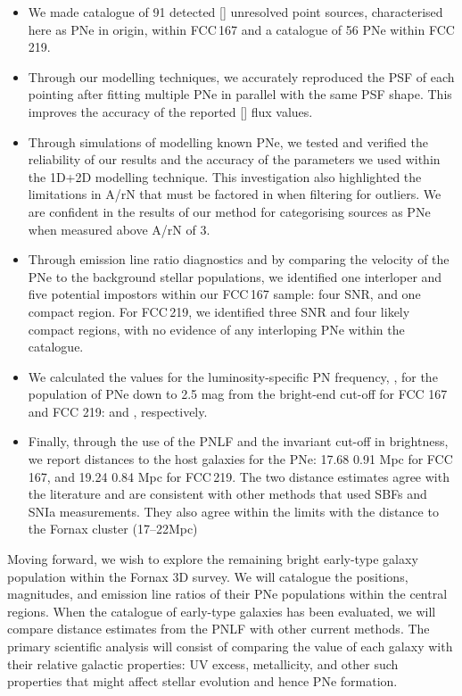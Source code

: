 \documentclass{aa}
\begin{document}
\begin{itemize}
    \item We made catalogue of 91 detected [] unresolved point sources, characterised here as PNe in origin, within FCC\,167 and a catalogue of 56 PNe within FCC 219.
    
    \item Through our modelling techniques, we accurately reproduced the PSF of each pointing after fitting multiple PNe in parallel with the same PSF shape. This improves the accuracy of the reported [] flux values.
    
    \item Through simulations of modelling known PNe, we tested and verified the reliability of our results and the accuracy of the parameters we used within the 1D+2D modelling technique. This investigation also highlighted the limitations in A/rN that must be factored in when filtering for outliers. We are confident in the results of our method for categorising sources as PNe when measured above A/rN of 3.
    
    \item Through emission line ratio diagnostics and by comparing the velocity of the PNe to the background stellar populations, we identified one interloper and five potential impostors within our FCC\,167 sample: four SNR, and one compact  region. For FCC\,219, we identified three SNR and four likely compact  regions, with no evidence of any interloping PNe within the catalogue.
    
    \item We calculated the values for the luminosity-specific PN frequency, , for the population of PNe down to 2.5 mag from the bright-end cut-off for FCC 167 and FCC 219:  and  , respectively.

    \item Finally, through the use of the PNLF and the invariant cut-off in brightness, we report distances to the host galaxies for the PNe: 17.68  0.91 Mpc for FCC\,167, and 19.24  0.84 Mpc for FCC\,219. The two distance estimates agree with the literature and are consistent with other methods that used SBFs and SNIa measurements. They also agree within the limits with the distance to the Fornax cluster (17--22Mpc)
\end{itemize}

Moving forward, we wish to explore the remaining bright early-type galaxy population within the Fornax 3D survey. We will catalogue the positions, magnitudes, and emission line ratios of their PNe populations within the central regions. When the catalogue of early-type galaxies has been evaluated, we will compare distance estimates from the PNLF with other current methods. The primary scientific analysis will consist of comparing the  value of each galaxy with their relative galactic properties: UV excess, metallicity, and other such properties that might affect stellar evolution and hence PNe formation.
\end{document}
